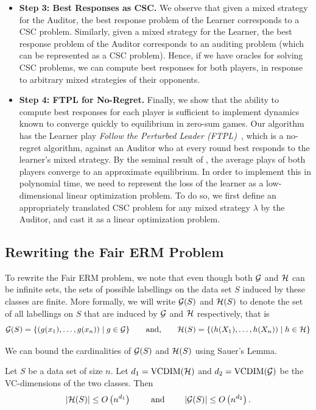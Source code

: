 \begin{itemize}
\item
{\bf Step 3: Best Responses as CSC.}
We observe that given a mixed strategy for the Auditor, the best response problem of the Learner corresponds to a CSC problem. Similarly, given a mixed strategy for the Learner, the best response problem of the Auditor corresponds to an auditing problem (which can be represented as a CSC problem). Hence, if we have oracles for solving CSC problems, we can compute best responses for both players, in response to arbitrary mixed strategies of their opponents.

\item
{\bf Step 4: FTPL for No-Regret.}
Finally, we show that the ability to compute best responses for each
player is sufficient to implement dynamics known to converge quickly to
equilibrium in zero-sum games.  Our algorithm has the Learner
play {\em Follow the Perturbed Leader (FTPL)\/}~\cite{KV05}, which is
a no-regret algorithm, against an Auditor who at every round best
responds to the learner's mixed strategy. By the seminal result of
\citet{FS96}, the average plays of both players converge to an
approximate equilibrium.  In order to implement this in polynomial
time, we need to represent the loss of the learner as a
low-dimensional linear optimization problem. To do so, we first define
an appropriately translated CSC problem for any mixed strategy
$\lambda$ by the Auditor, and cast it as a linear optimization problem.
\end{itemize}




\subsection{Rewriting the Fair ERM Problem}
To rewrite the Fair ERM problem, we note that even though both $\mathcal{G}$
and $\mathcal{H}$ can be infinite sets, the sets of possible labellings on the
data set $S$ induced by these classes are finite. More formally, we
will write $\mathcal{G}(S)$ and $\mathcal{H}(S)$ to denote the set of all labellings
on $S$ that are induced by $\mathcal{G}$ and $\mathcal{H}$ respectively, that is
\[
  \mathcal{G}(S) = \{(g(x_1), \ldots , g(x_n)) \mid g\in \mathcal{G}\} \qquad
  \mbox{and,} \qquad \mathcal{H}(S) = \{(h(X_1), \ldots , h(X_n))\mid h\in
  \mathcal{H}\}
\]

We can bound the cardinalities of $\mathcal{G}(S)$ and $\mathcal{H}(S)$ using
Sauer's Lemma.

\begin{lemma}\label{lem:sauer}
  Let $S$ be a data set of size $n$.  Let $d_1 = \mathrm{VCDIM}(\mathcal{H})$ and
  $d_2 = \mathrm{VCDIM}(\mathcal{G})$ be the VC-dimensions of the two classes. Then
  \[
    |\mathcal{H}(S)| \leq O\left(n^{d_1} \right) \qquad \mbox{ and } \qquad
    |\mathcal{G}(S)| \leq O\left(n^{d_2} \right).
  \]
\end{lemma}


